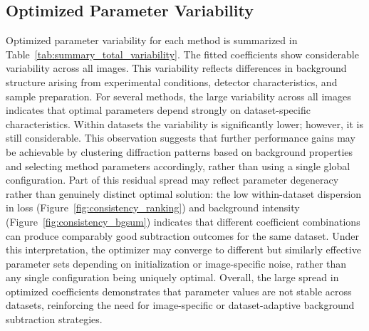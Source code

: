 \documentclass[iucr]{iucrjournals}
\begin{document}
\subsection{Optimized Parameter Variability}

Optimized parameter variability for each method is summarized in Table~\ref{tab:summary_total_variability}. The fitted coefficients show considerable variability across all images. This variability reflects differences in background structure arising from experimental conditions, detector characteristics, and sample preparation. For several methods, the large variability across all images indicates that optimal parameters depend strongly on dataset-specific characteristics. Within datasets the variability is significantly lower; however, it is still considerable. This observation suggests that further performance gains may be achievable by clustering diffraction patterns based on background properties and selecting method parameters accordingly, rather than using a single global configuration. Part of this residual spread may reflect parameter degeneracy rather than genuinely distinct optimal solution: the low within-dataset dispersion in loss (Figure~\ref{fig:consistency_ranking}) and background intensity (Figure~\ref{fig:consistency_bgsum}) indicates that different coefficient combinations can produce comparably good subtraction outcomes for the same dataset. Under this interpretation, the optimizer may converge to different but similarly effective parameter sets depending on initialization or image-specific noise, rather than any single configuration being uniquely optimal. Overall, the large spread in optimized coefficients demonstrates that parameter values are not stable across datasets, reinforcing the need for image-specific or dataset-adaptive background subtraction strategies.
\end{document}
